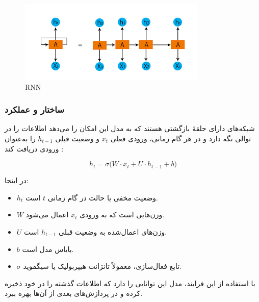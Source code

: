  \begin{figure}[h]
	\centering
	\begin{minipage}[b]{0.7\textwidth}
		\centering
		\includegraphics[width=\textwidth]{transformer_images/rnn_image.png}
		\caption{RNN}
		\label{fig:RNN}
	\end{minipage}
	\hfill
	
\end{figure}








\subsubsection{ساختار و عملکرد }
شبکه‌های  دارای حلقهٔ بازگشتی هستند که به مدل این امکان را می‌دهد اطلاعات را در توالی نگه دارد و در هر گام زمانی، ورودی فعلی \( x_t \) و وضعیت قبلی \( h_{t-1} \) را به‌عنوان ورودی دریافت کند
\cite{goodfellow2016deep}:

\begin{equation}
	h_t = \sigma \big( W \cdot x_t + U \cdot h_{t-1} + b \big)
\end{equation}

در اینجا:
\begin{itemize}
	\item \( h_t \) وضعیت مخفی یا حالت در گام زمانی \( t \) است.
	\item \( W \) وزن‌هایی است که به ورودی \( x_t \) اعمال می‌شود.
	\item \( U \) وزن‌های اعمال‌شده به وضعیت قبلی \( h_{t-1} \) است.
	\item \( b \) بایاس مدل است.
	\item \( \sigma \) تابع فعال‌سازی، معمولاً تانژانت هیپربولیک یا سیگموید.
\end{itemize}

با استفاده از این فرایند، مدل این توانایی را دارد که اطلاعات گذشته را در خود ذخیره کرده و در پردازش‌های بعدی از آن‌ها بهره ببرد.

